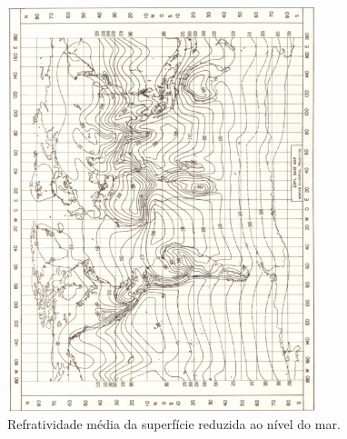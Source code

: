 \begin{table}[h]
\centering
\caption[Refratividade da superfície em função do clima da região.]
{Refratividade da superfície em função do clima da região.}
\label{table:climatetable}
\end{table}

\begin{figure}[nsmap]
\centering
\includegraphics[width=0.8\textwidth]{figs/nsmap}
\caption[Refratividade média da superfície reduzida ao nível do mar.]
{Refratividade média da superfície reduzida ao nível do mar.}
\label{fig:nsmap}
\end{figure}


